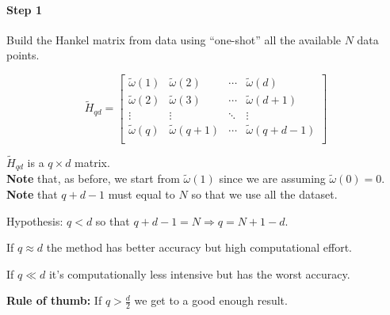 
\paragraph{Step 1} Build the Hankel matrix from data using ``one-shot'' all the available $N$ data points.

\[
    \tilde{H}_{qd} = \begin{bmatrix}
        \tilde{\omega}(1) & \tilde{\omega}(2) & \cdots & \tilde{\omega}(d) \\
        \tilde{\omega}(2) & \tilde{\omega}(3) & \cdots & \tilde{\omega}(d+1) \\
        \vdots            & \vdots            & \ddots & \vdots \\
        \tilde{\omega}(q) & \tilde{\omega}(q+1) & \cdots & \tilde{\omega}(q+d-1) \\
    \end{bmatrix}
\]

$\tilde{H}_{qd}$ is a $q\times d$ matrix.\\
\textbf{Note} that, as before, we start from $\tilde{\omega}(1)$ since we are assuming $\tilde{\omega}(0)=0$. \\
\textbf{Note} that $q+d-1$ must equal to $N$ so that we use all the dataset.


\begin{remark}
    Hypothesis: $q<d$ so that $q+d-1=N \Rightarrow q=N+1-d$.
    \begin{figure}[H]
        \centering
    \end{figure}

    If $q \approx d$ the method has better accuracy but high computational effort.
    
    If $q \ll d$ it's computationally less intensive but has the worst accuracy.

    \textbf{Rule of thumb:} If $ q > \frac{d}{2}$ we get to a good enough result.
\end{remark}

